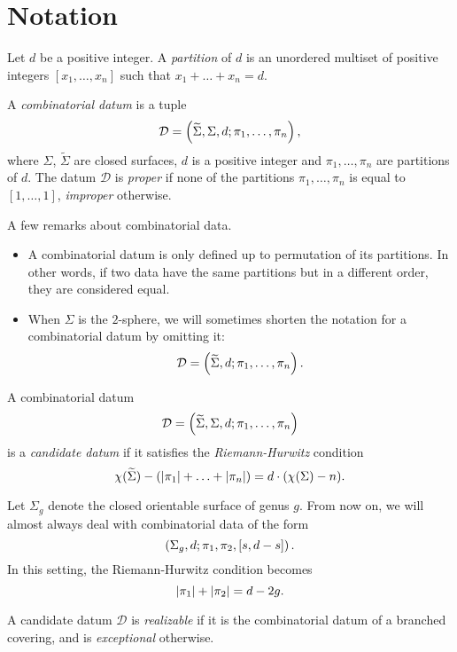 \documentclass{article}
\begin{document}
\section{Notation}
\begin{definition}
Let $d$ be a positive integer. A \emph{partition} of $d$ is an unordered multiset of positive integers $[x_1,\ldots,x_n]$ such that $x_1+\ldots+x_n=d$.
\end{definition}
\begin{definition}
A \emph{combinatorial datum} is a tuple
\[
\mathcal{D}=\left(\widetilde\Sigma,\Sigma,d;\pi_1,\ldots,\pi_n\right),
\]
where $\Sigma$, $\widetilde\Sigma$ are closed surfaces, $d$ is a positive integer and $\pi_1,\ldots,\pi_n$ are partitions of $d$. The datum $\mathcal{D}$ is \emph{proper} if none of the partitions $\pi_1,\ldots,\pi_n$ is equal to $[1,\ldots,1]$, \emph{improper} otherwise.
\end{definition}

A few remarks about combinatorial data.
\begin{itemize}
\item A combinatorial datum is only defined up to permutation of its partitions. In other words, if two data have the same partitions but in a different order, they are considered equal.
\item When $\Sigma$ is the $2$-sphere, we will sometimes shorten the notation for a combinatorial datum by omitting it:
\[
\mathcal{D}=\left(\widetilde\Sigma,d;\pi_1,\ldots,\pi_n\right).
\]
\end{itemize}

\begin{definition}
A combinatorial datum
\[
\mathcal{D}=\left(\widetilde\Sigma,\Sigma,d;\pi_1,\ldots,\pi_n\right)
\]
is a \emph{candidate datum} if it satisfies the \emph{Riemann-Hurwitz} condition
\[
\chi(\widetilde\Sigma)-\left(\left|\pi_1\right|+\ldots+\left|\pi_n\right|\right)=d\cdot(\chi(\Sigma)-n).
\]
\end{definition}

Let $\Sigma_g$ denote the closed orientable surface of genus $g$. From now on, we will almost always deal with combinatorial data of the form
\[
\left(\Sigma_g,d;\pi_1,\pi_2,[s,d-s]\right).
\]
In this setting, the Riemann-Hurwitz condition becomes
\begin{equation}\label{eq:rh-n3}
\left|\pi_1\right|+\left|\pi_2\right|=d-2g.
\end{equation}

\begin{definition}
A candidate datum $\mathcal{D}$ is \emph{realizable} if it is the combinatorial datum of a branched covering, and is \emph{exceptional} otherwise.
\end{definition}
\end{document}
